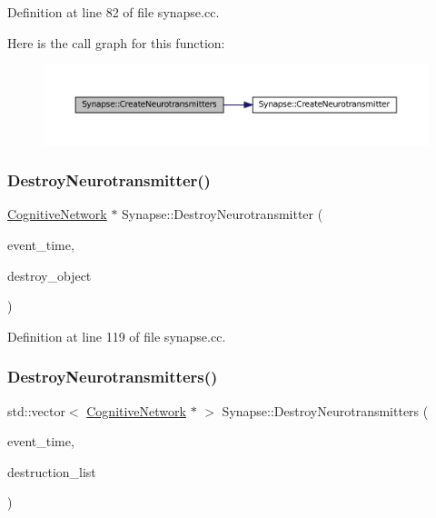Definition at line 82 of file synapse.\+cc.

Here is the call graph for this function\+:\nopagebreak
\begin{figure}[H]
\begin{center}
\leavevmode
\includegraphics[width=350pt]{class_synapse_a593c70925fb80b880c6a01f2f252eb22_cgraph}
\end{center}
\end{figure}
\mbox{\label{class_synapse_a8d53488bdd8f0bd97216e5d388df35b8}} 
\subsubsection{\texorpdfstring{Destroy\+Neurotransmitter()}{DestroyNeurotransmitter()}}
{\footnotesize\ttfamily \mbox{\hyperlink{class_cognitive_network}{Cognitive\+Network}} $\ast$ Synapse\+::\+Destroy\+Neurotransmitter (\begin{DoxyParamCaption}\item[{std\+::chrono\+::time\+\_\+point$<$ \mbox{\hyperlink{universe_8h_a0ef8d951d1ca5ab3cfaf7ab4c7a6fd80}{Clock}} $>$}]{event\+\_\+time,  }\item[{\mbox{\hyperlink{class_cognitive_network}{Cognitive\+Network}} $\ast$}]{destroy\+\_\+object }\end{DoxyParamCaption})}



Definition at line 119 of file synapse.\+cc.

\mbox{\label{class_synapse_a58c882f356bc34c66a7cd2b345532ec9}} 
\subsubsection{\texorpdfstring{Destroy\+Neurotransmitters()}{DestroyNeurotransmitters()}}
{\footnotesize\ttfamily std\+::vector$<$ \mbox{\hyperlink{class_cognitive_network}{Cognitive\+Network}} $\ast$ $>$ Synapse\+::\+Destroy\+Neurotransmitters (\begin{DoxyParamCaption}\item[{std\+::chrono\+::time\+\_\+point$<$ \mbox{\hyperlink{universe_8h_a0ef8d951d1ca5ab3cfaf7ab4c7a6fd80}{Clock}} $>$}]{event\+\_\+time,  }\item[{std\+::vector$<$ \mbox{\hyperlink{class_cognitive_network}{Cognitive\+Network}} $\ast$$>$}]{destruction\+\_\+list }\end{DoxyParamCaption})}



